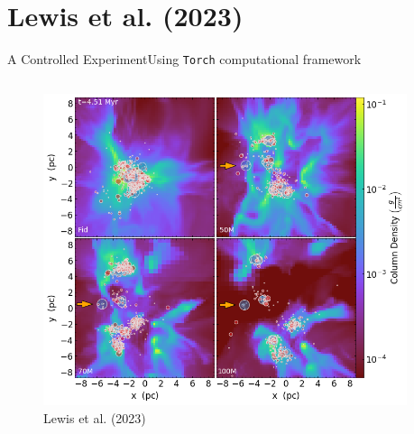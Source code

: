 \documentclass[aspectratio=169]{beamer}
\begin{document}
\section{Lewis et al. (2023)}
\begin{frame}{A Controlled Experiment}{Using \texttt{Torch} computational framework}
    \begin{columns}
        \begin{column}{0.45\textwidth}
            \begin{figure}[h!]
                \centering
                \includegraphics[width=\linewidth]{../images/density_grid.png} \\
                Lewis et al. (2023)
                \label{fig:density}
            \end{figure}
        \end{column}
        \begin{column}{0.35\textwidth}
            

\end{column}
\end{columns}
\end{frame}
\end{document}
